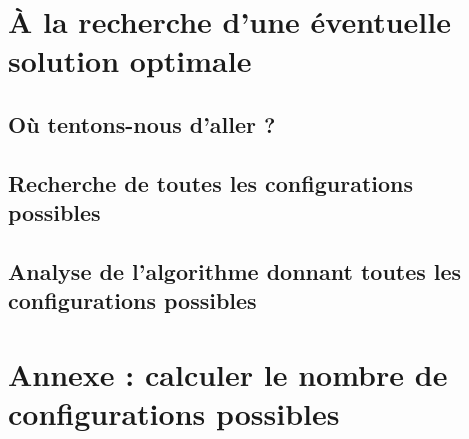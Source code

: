 \documentclass[a4,11pt]{article}
\begin{document}
\hspace{1cm}

\clearpage

%
%
%
%
%
%
%
%
%
%    
%
%
%    
%
%
%    
%
%
%    


\section{À la recherche d'une éventuelle solution optimale}    %
	\subsection{Où tentons-nous d'aller ?}
    	

	\subsection{Recherche de toutes les configurations possibles}

	\subsection{Analyse de l'algorithme donnant toutes les configurations possibles}


\section{Annexe : calculer le nombre de configurations possibles}    %
    
\end{document}

